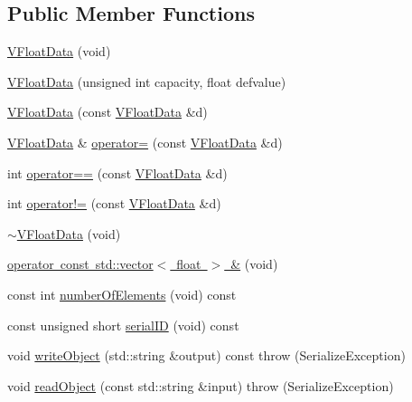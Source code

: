 \subsection*{Public Member Functions}
\begin{DoxyCompactItemize}
\item 
\mbox{\hyperlink{classFILEDB_1_1VFloatData_a25f93b52c82fdc6299e386be3e251912}{V\+Float\+Data}} (void)
\item 
\mbox{\hyperlink{classFILEDB_1_1VFloatData_a27b94ed1e86096f64166bcd712b2ae94}{V\+Float\+Data}} (unsigned int capacity, float defvalue)
\item 
\mbox{\hyperlink{classFILEDB_1_1VFloatData_af51a333fc7a5e7aa94f75656efaa83c6}{V\+Float\+Data}} (const \mbox{\hyperlink{classFILEDB_1_1VFloatData}{V\+Float\+Data}} \&d)
\item 
\mbox{\hyperlink{classFILEDB_1_1VFloatData}{V\+Float\+Data}} \& \mbox{\hyperlink{classFILEDB_1_1VFloatData_a8aecd0607b79c41f846510307450fa47}{operator=}} (const \mbox{\hyperlink{classFILEDB_1_1VFloatData}{V\+Float\+Data}} \&d)
\item 
int \mbox{\hyperlink{classFILEDB_1_1VFloatData_ac6cbdff5219aeabc1e182721ff9d6d7c}{operator==}} (const \mbox{\hyperlink{classFILEDB_1_1VFloatData}{V\+Float\+Data}} \&d)
\item 
int \mbox{\hyperlink{classFILEDB_1_1VFloatData_ab54605c8c5239fc22b85c4514ced5a24}{operator!=}} (const \mbox{\hyperlink{classFILEDB_1_1VFloatData}{V\+Float\+Data}} \&d)
\item 
\mbox{\hyperlink{classFILEDB_1_1VFloatData_a94f96be436999db58bfbff512cda6d63}{$\sim$\+V\+Float\+Data}} (void)
\item 
\mbox{\hyperlink{classFILEDB_1_1VFloatData_a9ac82e245522972ecb6667ec078336b5}{operator const std\+::vector$<$ float $>$ \&}} (void)
\item 
const int \mbox{\hyperlink{classFILEDB_1_1VFloatData_a1ef52e51516fd02fa123199c63cef647}{number\+Of\+Elements}} (void) const
\item 
const unsigned short \mbox{\hyperlink{classFILEDB_1_1VFloatData_a63b06bc5c69783fcbb4ab699b2633815}{serial\+ID}} (void) const
\item 
void \mbox{\hyperlink{classFILEDB_1_1VFloatData_afad9c7e520cdd7bf9ae0b477b8a5f1f1}{write\+Object}} (std\+::string \&output) const  throw (\+Serialize\+Exception)
\item 
void \mbox{\hyperlink{classFILEDB_1_1VFloatData_ae217975cba234df3601c065669f26f38}{read\+Object}} (const std\+::string \&input)  throw (\+Serialize\+Exception)
\end{DoxyCompactItemize}

